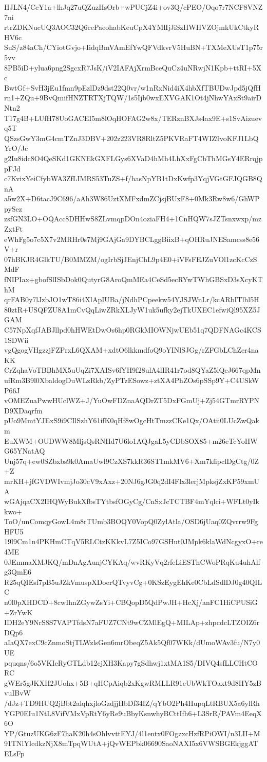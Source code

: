 HJLN4/CcY1a+lhJq27uQZuzHsOrb+wPUCjZ4i+ov3Q/cPEO/Oqo7r7NCF8VNZ7ni
rtrZDKNucUQ3AOC32Q6cePaeohabKeuCpX4YMlIjJiSzHWHVZOjmkUkCtkyRHV6c
SuS/z84aCh/CYiotGvjo+IidqBmVAmEfYwQFVdkvrV5HuBN+TXMeXUsT1p75r5vv
8PB5iD+ylua6png2SgcxR7JsK/iV2IAFAjXrmBceQuCz4uNRwjN1Kpb+ttRI+5Xc
BwtGf+SvH3jEu1fmn9pEzlDz9dst22Q0vr/w1nRxNid4iX4hbXfTBUDwJpd5jQfH
rn1+ZQu+9BvQmifHNZTRTXjTQW/1s5Ijb0wxEXVGAK1Ot4jNhwYAxSt9airDNtn2
T17g4B+LUfH78UoGACEI5m8lOqHOFAG2w8x/TERznBXJs4ax9E+s1SvAizuevq5T
QSzsGwY3mG4cmTZnJ3DBV+202z223VR8RltZ5PKVRaFT4WIZ9voKFJ1LbQYrO/Jc
g2Iu8idc8O4QeSKd1GKNEkGXFLGys6XVaD4hMh4LhXxFgCbThMGsY4ERrqjppFJd
c7KvixYeiCfybWA3ZfLIMRS53TuZS+f/hasNpYB1tDxKwfp3YqjVGtGFJQGB8QnA
a5w2X+D6tacJ9C696/aAh3W86UztXMFxdmZCjsjBUxF8+0Mk3Rw8w6/GhWPpySez
zsfGN3LO+OQAcc8DHHwS8ZLvmqpDOn4oziaFH4+1CnHQW7sJZTsnxwxp/mzZxtFt
eWhFg5o7c5X7v2MRHr0s7Mj9GAjGa9DYBCLggBiixB+qOHRuJNESamcss8e56V+r
07hBKJR4GlkTU/B0MMZM/ogIrbSjJEnjChL9p4E0+iVFsFEJZuVOl1zcKcCzSMdF
fNIPIax+gbofSlISbDok0QutyrG8AroQmMEa4CeSd5ecRYwTWhGBSxD3sXcyKThM
qrFAB0y7lJzbJO1wT86i4XlApIUBa/jNdhPCpeekw54YJSJWnLr/kcARbITlhl5H
80ztR+USQFZU8A1mCvQqLiwZRkXLJyW1uk5ufky2ejTkUXEC1efwiQl95XZ5JGAM
C57NpXqfJABJllpd0hHWEtDwOs6hp0RGkMIOWNjwUEb51q7QDFNAGc4KCS1SDWii
vgQgogVHgzzjFZPrxL6QXAM+xdtO6lkkmdfoQ9oYINlSJGg/rZFGbLChZer4naKK
CrZqhaVoTBBhMX5uUqZi7XAISv6fYH9f28ulA4lIR41r7od8QYaZ5lQcJ667qpMn
ufRm3B9l0XbaldogDuWLzRkb/ZyPTzESowz+ztXA4PhZOs6pSSp9Y+C4USkWP66J
vOMEZuaPwwHUclWZ+J/YuOwFDZnaAQDrZT5DxFGmUj+Zj54GTmrRYPND9XDaqrfm
pUo9MmtYJExS9i9CIlSzhY61ifK0qHf8wOgcHtTmzzCKe1Qx/OAtii0LUcZwQakm
EuXWM+OUDWW8MljsQsRNHd7U6lo1AQJgaL5yCDbSOX85+m26eTcYoHWG65YNatAQ
Unj57q+ew0SZbxbs9k0AmaUwl9CzXS7kkR36ST1mkMV6+Xm7kfipclDgCtg/0Z+Z
mrKH+jfGVDWIvmjJo30cV9xAxz+20NJ6gJG0q2dI4Flx3lerjMpksjZxKP59xmUA
wGAjqaCX2IHQWyBukXfbsTYtbsfOGyCg/CnSxJcTCTBF4mYqlci+WFLt0yIkkwo+
ToO/unComqyGowL4m8rTUmb3BOQY0VopQ0ZylAtla/OSD6jUaq0ZQvrrw9FgHFU5
19l9Cm1n4PKHmCTqV5RLCtzKKkvL7Z5ICo97GSHut0JMpk6klaWdNcgyxO+re4ME
0JEmmaXMJKQ/mDnAgAunjCYKAq/wvRKyVq2rfeLiESThCWoPRqKu4uhAlfg3QmE6
R25qQIEsf7pB5uJZkVmuspXDoerQTvyvCg+0KSzEygEhKe0CbLdSdlDJ0g40QILC
n0l0pXHDCD+8cwIhnZGywZsYi+CBQopD5QdPwJH+HcXj/anFC1HiCPUSiG+ZrYwK
IDH2eY9NrS8S7VAPTfdsN7aFUZ7CNt9wCZMlEgQ+MILAp+zhpcdcLTZOIZ6rDQp6
aIaQX7exC9cZnmoStjTLWzlsGen6mrObeqZ5Ak5Qf07WKk/dUmoWAv3fu/N7y0UE
pquqns/6o5VKIeRyGTLdb12cjXH3Kapy7gSdhwj1xtMA1S5/DIVQ4sfLLCHtCORC
gWEr5gJKXH2JUohx+5B+qHCpAiqb2xKgwRMLLR91eUbWkTOaxt9d8HY5zBvuIBvW
/dJz+TD9HUQ2jBbt2alqhxjloGzdjjHbDf34IZ/qYbO2Ph4HupqLtRBUX5a6ylRh
YGP0EIu1NtL8VifVMxVpRtY6yRe9uBbyKsnwhyBCttIfh6+L3SrR/PAVm4EeqX6O
YP/GtuzUKG6zF7haK20h4sOhlvvttEYJ/4l1entx0FOgzxcHzfRPiOWI/n3LII+M
91TNlYlcdkzNjX8mTpqWUtA+jQvWEPbk06690SaoNAXI5x6VWSBGEkjggATELsFp
